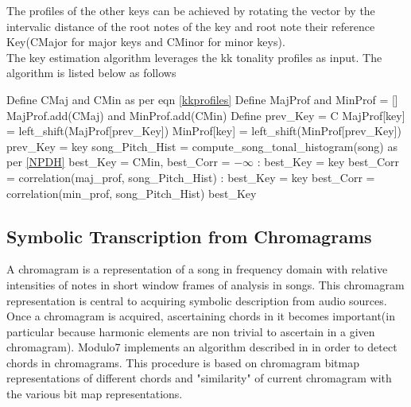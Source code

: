 \noindent The profiles of the other keys can be achieved by rotating the vector by the intervalic distance of the root notes of the key and root note their reference Key(CMajor for major keys and CMinor for minor keys). \\

\noindent The key estimation algorithm leverages the kk tonality profiles as input. The algorithm is listed below as follows \cite{kkTonalityKeyFinding}

\begin{algorithm}

\label{CHalgorithm}
\begin{algorithmic}[1]
 {}
\State Define CMaj and CMin as per eqn \ref{kkprofiles}
\State Define MajProf and MinProf = [] %
\State MajProf.add(CMaj) and MinProf.add(CMin)
\State Define prev\_Key = C 
\State MajProf[key] = left\_shift(MajProf[prev\_Key])
\State MinProf[key] = left\_shift(MinProf[prev\_Key])
\State prev\_Key = key
\EndFor
\State song\_Pitch\_Hist = compute\_song\_tonal\_histogram(song) as per \ref{NPDH}
\State best\_Key = CMin, best\_Corr = $-\infty$
:
\State best\_Key = key
\State best\_Corr = correlation(maj\_prof, song\_Pitch\_Hist)
\EndIf
\EndFor
{}:
\State best\_Key = key
\State best\_Corr = correlation(min\_prof, song\_Pitch\_Hist)
\EndIf
\EndFor
\Return best\_Key
\EndProcedure
\end{algorithmic}
\end{algorithm}

\subsection{Symbolic Transcription from Chromagrams} \label{chromagramest}

\noindent A chromagram \cite{chromagramtutorial} is a representation of a song in frequency domain with relative intensities of notes in short window frames of analysis in songs. This chromagram representation is central to acquiring symbolic description from audio sources. Once a chromagram is acquired, ascertaining chords in it becomes important(in particular because harmonic elements are non trivial to ascertain in a given chromagram). Modulo7 implements an algorithm described in \cite{chord-detection} in order to detect chords in chromagrams. This procedure is based on chromagram bitmap representations of different chords and "similarity" of current chromagram with the various bit map representations. \\

